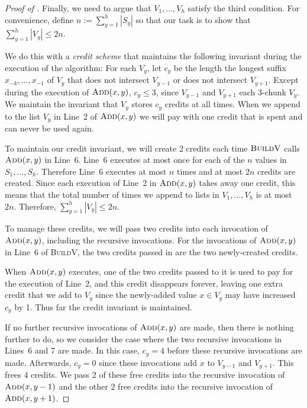 \documentclass[kpfonts]{patmorin}
\begin{document}
\begin{proof}[Proof of ]
  Finally, we need to argue that $V_1,\ldots,V_h$ satisfy the third condition. 
  For convenience, define $n:=\sum_{y=1}^h |S_y|$ so that our task is to show that $\sum_{y=1}^h |V_y|\le 2n$.

  We do this with a \emph{credit scheme} that maintains the following invariant  during the execution of the algorithm:  For each $V_y$, let $c_y$ be the length the longest suffix $x_{-k},\ldots,x_{-1}$ of $V_y$ that does not intersect $V_{y-1}$ or does not intersect $V_{y+1}$.  Except during the execution of $\textsc{Add}(x,y)$, $c_y\le 3$, since $V_{y-1}$ and $V_{y+1}$ each 3-chunk $V_y$.  We maintain the invariant that $V_{y}$ stores $c_y$ credits at all times.  When we append to the list $V_y$ in Line~2 of $\textsc{Add}(x,y)$ we will pay with one credit that is spent and can never be used again.
  
  To maintain our credit invariant, we will create 2 credits each time $\textsc{BuildV}$ calls $\textsc{Add}(x,y)$ in Line~6.  Line~6 executes at most once for each of the $n$ values in $S_1,\ldots,S_h$.  Therefore Line~6 executes at most $n$ times and at most $2n$ credits are created.  Since each execution of Line~2 in $\textsc{Add}(x,y)$ takes away one credit, this means that the total number of times we append to lists in $V_1,\ldots,V_h$ is at most $2n$. Therefore, $\sum_{y=1}^h |V_y|\le 2n$.
   
  To manage these credits, we will pass two credits into each invocation of $\textsc{Add}(x,y)$, including the recursive invocations.  For the invocations of $\textsc{Add}(x,y)$ in Line~6 of \textsc{BuildV}, the two credits passed in are the two newly-created credits.
  
  When $\textsc{Add}(x,y)$ executes, one of the two credits passed to it is used to pay for the execution of Line~2, and this credit disappears forever, leaving one extra credit that we add to $V_y$ since the newly-added value $x\in V_y$ may have increased $c_y$ by 1. Thus far the credit invariant is maintained.  
  
  If no further recursive invocations of $\textsc{Add}(x,y)$ are made, then there is nothing further to do, so we consider the case where the two recursive invocations in Lines~6 and 7 are made.  In this case, $c_y=4$ before these recursive invocations are made.  Afterwards, $c_y=0$ since these invocations add $x$ to $V_{y-1}$ and $V_{y+1}$.  This frees 4 credits.  We pass 2 of these free credits into the recursive invocation of $\textsc{Add}(x,y-1)$ and the other 2 free credits into the recursive invocation of $\textsc{Add}(x,y+1)$. 
\end{proof}
\end{document}
